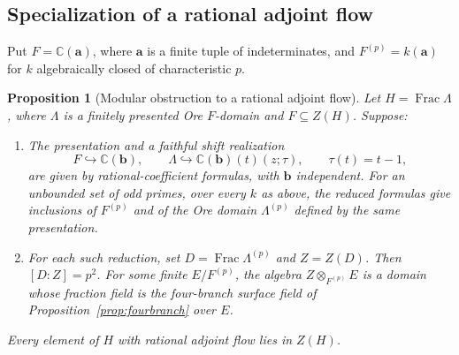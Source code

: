 \documentclass[11pt,a4paper]{article}
\newtheorem{proposition}[theorem]{Proposition}
\theoremstyle{definition}
\begin{document}
\subsection{Specialization of a rational adjoint flow}

Put \(F=\mathbb C(\mathbf a)\), where \(\mathbf a\) is a finite tuple of
indeterminates, and \(F^{(p)}=k(\mathbf a)\) for \(k\) algebraically
closed of characteristic \(p\).

\begin{proposition}[Modular obstruction to a rational adjoint flow]
\label{prop:modularflow}
Let \(H=\operatorname{Frac}\Lambda\), where \(\Lambda\) is a finitely
presented Ore \(F\)-domain and \(F\subseteq Z(H)\). Suppose:
\begin{enumerate}
\item The presentation and a faithful shift realization
\[
 F\hookrightarrow\mathbb C(\mathbf b),\qquad
 \Lambda\hookrightarrow \mathbb C(\mathbf b)(t)(z;\tau),\qquad
 \tau(t)=t-1,
\]
are given by rational-coefficient formulas, with \(\mathbf b\)
independent. For an unbounded set of odd primes, over every \(k\) as
above, the reduced formulas give inclusions of \(F^{(p)}\) and of the
Ore domain \(\Lambda^{(p)}\) defined by the same presentation.
\item For each such reduction, set \(D=\operatorname{Frac}\Lambda^{(p)}\)
and \(Z=Z(D)\). Then \([D:Z]=p^2\). For some finite
\(E/F^{(p)}\), the algebra \(Z\otimes_{F^{(p)}}E\) is a domain whose
fraction field is the four-branch surface field of
Proposition~\ref{prop:fourbranch} over \(E\).
\end{enumerate}
Every element of \(H\) with rational adjoint flow lies in \(Z(H)\).
\end{proposition}
\end{document}
